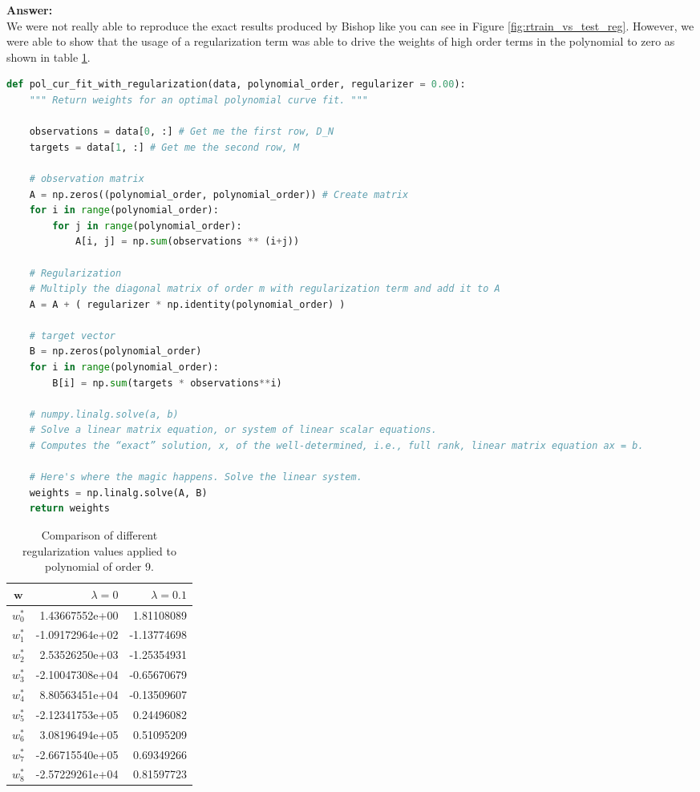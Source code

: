 \documentclass[a4paper]{article}
\begin{document}
\textbf{Answer:}\\

We were not really able to reproduce the exact results produced by Bishop like you can see in Figure \ref{fig:rtrain_vs_test_reg}. However, we were able to show that the usage of a regularization term was able to drive the weights of high order terms in the polynomial to zero as shown in table \ref{table:reg}.

\begin{lstlisting}[language=Python]
def pol_cur_fit_with_regularization(data, polynomial_order, regularizer = 0.00):
    """ Return weights for an optimal polynomial curve fit. """
    
    observations = data[0, :] # Get me the first row, D_N
    targets = data[1, :] # Get me the second row, M
    
    # observation matrix
    A = np.zeros((polynomial_order, polynomial_order)) # Create matrix
    for i in range(polynomial_order):
        for j in range(polynomial_order):
            A[i, j] = np.sum(observations ** (i+j))
    
    # Regularization
    # Multiply the diagonal matrix of order m with regularization term and add it to A
    A = A + ( regularizer * np.identity(polynomial_order) )
    
    # target vector        
    B = np.zeros(polynomial_order)
    for i in range(polynomial_order):
        B[i] = np.sum(targets * observations**i)
    
    # numpy.linalg.solve(a, b)
    # Solve a linear matrix equation, or system of linear scalar equations.
    # Computes the “exact” solution, x, of the well-determined, i.e., full rank, linear matrix equation ax = b.
    
    # Here's where the magic happens. Solve the linear system.
    weights = np.linalg.solve(A, B)
    return weights
\end{lstlisting}

\begin{table}[H]
\centering
\begin{tabular}{c | r | r}
$\textbf{w}$ & $\lambda=0$ & $\lambda=0.1$ \\
\hline
$w^*_0$ & 1.43667552e+00 & 1.81108089 \\
$w^*_1$ & -1.09172964e+02 & -1.13774698 \\
$w^*_2$ & 2.53526250e+03 & -1.25354931\\
$w^*_3$ & -2.10047308e+04 & -0.65670679 \\
$w^*_4$ & 8.80563451e+04 & -0.13509607 \\
$w^*_5$ & -2.12341753e+05 & 0.24496082 \\
$w^*_6$ & 3.08196494e+05 & 0.51095209 \\
$w^*_7$ & -2.66715540e+05 & 0.69349266 \\ 
$w^*_8$ & -2.57229261e+04 & 0.81597723 
\end{tabular}
\caption{Comparison of different regularization values applied to polynomial of order 9.}
\label{table:reg}
\end{table}
\end{document}
